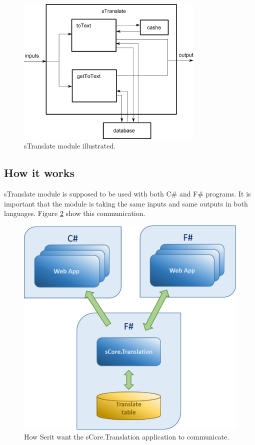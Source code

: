 \documentclass[12pt, a4paper]{article}
\begin{document}
\begin{figure}[!h]
    \includegraphics[width=0.8\textwidth]{sTranslateWorkings}
    \centering
    \caption{sTranslate module illustrated.}
    \label{fig:sTranslateWorkings}
\end{figure}

\newpage
\subsection{How it works}
sTranslate module is supposed to be used with both C\# and F\# programs. It is important that the module is taking the same inputs and same outputs in both languages. Figure \ref{fig:sTranslate_communication} show this communication.

\begin{figure}[!h]
    \includegraphics[scale=0.5]{image02}
    \centering
    \caption{How Serit want the sCore.Translation application to communicate.}
    \label{fig:sTranslate_communication}
\end{figure}
\end{document}
